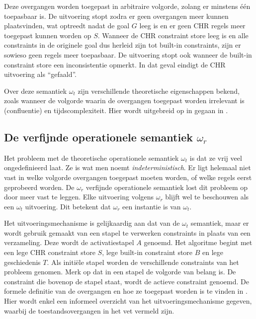 Deze overgangen worden toegepast in arbitraire volgorde, zolang er minstens \'e\'en toepasbaar is. De uitvoering stopt zodra er geen overgangen meer kunnen plaatsvinden, wat optreedt nadat de goal $G$ leeg is en er geen CHR regels meer toegepast kunnen worden op $S$. Wanneer de CHR constraint store leeg is en alle constraints in de originele goal dus herleid zijn tot built-in constraints, zijn er sowieso geen regels meer toepasbaar. De uitvoering stopt ook wanneer de built-in constraint store een inconsistentie opmerkt. In dat geval eindigt de CHR uitvoering als ``gefaald''.

Over deze semantiek $\omega_t$ zijn verschillende theoretische eigenschappen bekend, zoals wanneer de volgorde waarin de overgangen toegepast worden irrelevant is (confluentie) en tijdscomplexiteit. Hier wordt uitgebreid op in gegaan in \cite{tomsphdthesis}.

\subsection{De verfijnde operationele semantiek $\omega_r$} \label{sec:omegar}

Het probleem met de theoretische operationele semantiek $\omega_t$ is dat ze vrij veel ongedefinieerd laat. Ze is wat men noemt {\em indeterministisch}. Er ligt helemaal niet vast in welke volgorde overgangen toegepast moeten worden, of welke regels eerst geprobeerd worden. De $\omega_r$ verfijnde operationele semantiek lost dit probleem op door meer vast te leggen. Elke uitvoering volgens $\omega_r$ blijft wel te beschouwen als een $\omega_t$ uitvoering. Dit betekent dat $\omega_r$ een instantie is van $\omega_t$. 

Het uitvoeringsmechanisme is gelijkaardig aan dat van de $\omega_t$ semantiek, maar er wordt gebruik gemaakt van een stapel te verwerken constraints in plaats van een verzameling. Deze wordt de activatiestapel $A$ genoemd. Het algoritme begint met een lege CHR constraint store $S$, lege built-in constraint store $B$ en lege geschiedenis $T$. Als initi\"ele stapel worden de verschillende constraints van het probleem genomen. Merk op dat in een stapel de volgorde van belang is. De constraint die bovenop de stapel staat, wordt de actieve constraint genoemd. De formele definitie van de overgangen en hoe ze toegepast worden is te vinden in \cite{tomsphdthesis}. Hier wordt enkel een informeel overzicht van het uitvoeringsmechanisme gegeven, waarbij de toestandsovergangen in het vet vermeld zijn.

